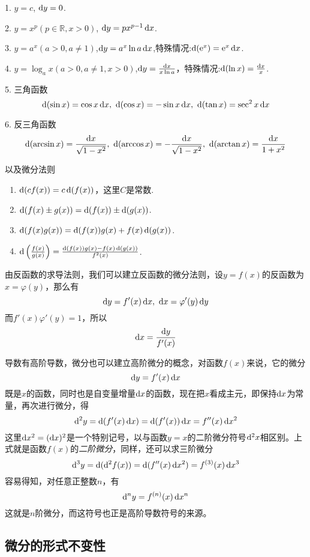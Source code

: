 1. $y=c$, $\dif y = 0$.

2. $y=x^p(p \in \mathbb{R},x>0)$, $\dif y = px^{p-1} \dif x$.

3. $y=a^x(a>0,a \neq 1)$,$\dif y=a^x\ln{a} \dif x$,特殊情况:$\dif (\mathrm{e}^x) = \mathrm{e}^x \dif x$.

4. $y=\log_a x(a>0,a\neq 1,x>0)$,$\dif y=\frac{\dif x}{x \ln{a}}$，特殊情况:$\dif (\ln{x}) = \frac{\dif x}{x}$.

5. 三角函数
\[ \dif (\sin{x}) = \cos{x} \dif x, \  \dif (\cos{x}) = -\sin{x} \dif x, \  \dif (\tan{x}) = \sec^2{x} \dif x \]

6. 反三角函数
\[ \dif (\arcsin{x}) = \frac{\dif x}{\sqrt{1-x^2}}, \  \dif (\arccos{x}) = - \frac{\dif x}{\sqrt{1-x^2}}, \ \dif (\arctan{x}) = \frac{\dif x}{1+x^2} \]

以及微分法则
\begin{enumerate}
\item $\dif (cf(x)) = c \dif (f(x))$，这里$C$是常数.
\item $\dif (f(x) \pm g(x)) = \dif (f(x)) \pm \dif (g(x))$.
\item $\dif (f(x)g(x)) = \dif (f(x))g(x) + f(x) \dif (g(x))$.
\item $\dif \left( \frac{f(x)}{g(x)} \right) = \frac{\dif (f(x))g(x) - f(x) \dif (g(x))}{f^2(x)}$.
\end{enumerate}

由反函数的求导法则，我们可以建立反函数的微分法则，设$y=f(x)$的反函数为$x=\varphi(y)$，那么有
\[ \dif y = f'(x) \dif x, \  \dif x = \varphi'(y) \dif y \]
而$f'(x)\varphi'(y)=1$，所以
\[ \dif x = \frac{\dif y}{f'(x)} \]

导数有高阶导数，微分也可以建立高阶微分的概念，对函数$f(x)$来说，它的微分
\[ \dif y = f'(x) \dif x \]
既是$x$的函数，同时也是自变量增量$\dif x$的函数，现在把$x$看成主元，即保持$\dif x$为常量，再次进行微分，得
\[ \dif^2 y = \dif (f'(x) \dif x) = \dif (f'(x)) \dif x = f''(x) \dif x^2 \]
这里$\dif x^2 = (\dif x)^2$是一个特别记号，以与函数$y=x$的二阶微分符号$\dif^2 x$相区别。上式就是函数$f(x)$的\emph{二阶微分}，同样，还可以求三阶微分
\[ \dif^3 y = \dif (\dif^2 f(x)) = \dif (f''(x) \dif x^2) = f^{(3)}(x) \dif x^3 \]
容易得知，对任意正整数$n$，有
\[ \dif^n y = f^{(n)}(x) \dif x^n \]
这就是$n$阶微分，而这符号也正是高阶导数符号的来源。

\subsection{微分的形式不变性}
\label{sec:the-non-variabriant-format-of-differtial}

